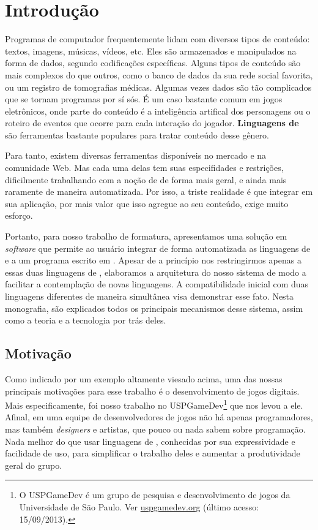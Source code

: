 
\chapter{Introdução}
\label{cap:intr}

Programas de computador frequentemente lidam com diversos tipos de conteúdo:
textos, imagens, músicas, vídeos, etc. Eles são armazenados e manipulados na
forma de dados, segundo codificações específicas. Alguns tipos de conteúdo são
mais complexos do que outros, como o banco de dados da sua rede social favorita,
ou um registro de tomografias médicas. Algumas vezes dados são tão
complicados que se tornam programas por sí sós. É um caso bastante comum em
jogos eletrônicos, onde parte do conteúdo é a inteligência artifical dos
personagens ou o roteiro de eventos que ocorre para cada interação do jogador.
\textbf{Linguagens de \script{}} são ferramentas bastante populares para tratar
conteúdo desse gênero.

Para tanto, existem diversas ferramentas disponíveis no mercado e na comunidade
Web. Mas cada uma delas tem suas especifidades e restrições, dificilmente
trabalhando com a noção de  de forma mais geral, e ainda mais
raramente de maneira automatizada. Por isso, a triste realidade é que integrar
 em sua aplicação, por mais valor que isso agregue ao seu conteúdo,
exige muito esforço.

Portanto, para nosso trabalho de formatura, apresentamos uma solução em
\textit{software} que permite ao usuário integrar de forma automatizada as
linguagens de \script{}  e  a um programa escrito em
\CXX{}. Apesar de a princípio nos restringirmos apenas a essas duas linguagens
de \script{}, elaboramos a arquitetura do nosso sistema de modo a facilitar
a contemplação de novas linguagens. A compatibilidade inicial com duas
linguagens diferentes de maneira simultânea visa demonstrar esse fato. Nesta
monografia, são explicados todos os principais mecanismos desse sistema, assim
como a teoria e a tecnologia por trás deles.

\section{Motivação}
\label{cap:intr:motivacao}

Como indicado por um exemplo altamente viesado acima, uma das nossas principais
motivações para esse trabalho é o desenvolvimento de jogos digitais. Mais
especificamente, foi nosso trabalho no USPGameDev\footnote{
  O USPGameDev é um grupo de pesquisa e desenvolvimento de jogos da
  Universidade de São Paulo. Ver \url{uspgamedev.org} (último acesso: 
  15/09/2013).
} que nos levou a ele. Afinal, em uma equipe de desenvolvedores de jogos não
há apenas programadores, mas também \textit{designers} e artistas, que pouco
ou nada sabem sobre programação. Nada melhor do que usar linguagens de
\script{}, conhecidas por sua expressividade e facilidade de uso, para
simplificar o trabalho deles e aumentar a produtividade geral do grupo.

